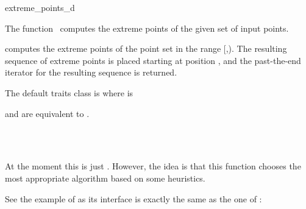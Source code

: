 \ccRefPageBegin


\begin{ccRefFunction}{extreme_points_d}  %


\ccDefinition

The function \ccRefName\ computes the extreme points of the given set of input points.


{computes the extreme points of the point set in the range [,). The resulting sequence of extreme points is placed starting at position , and the past-the-end iterator for the resulting sequence is returned.
}

The default traits class  is  where  is 


 and  are equivalent to .

\ccSeeAlso

\\
\\

\ccImplementation
At the moment this is just . However, the idea is that this function chooses the most appropriate algorithm based on some heuristics.

\ccExample
See the example of  as its interface is exactly the same as the one of \ccRefName:


\end{ccRefFunction}

\ccRefPageEnd

